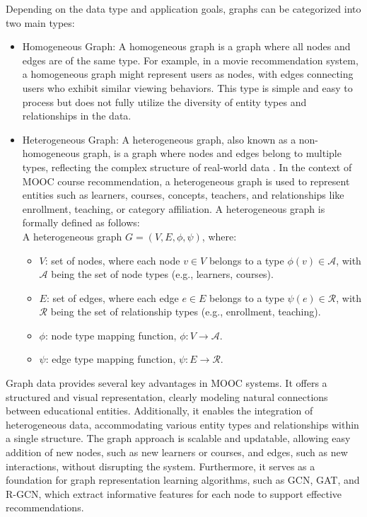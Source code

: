 \documentclass{ieeeaccess}
\begin{document}
Depending on the data type and application goals, graphs can be categorized into two main types:
\begin{itemize}
    \item Homogeneous Graph: A homogeneous graph is a graph where all nodes and edges are of the same type. For example, in a movie recommendation system, a homogeneous graph might represent users as nodes, with edges connecting users who exhibit similar viewing behaviors. This type is simple and easy to process but does not fully utilize the diversity of entity types and relationships in the data.
    \item Heterogeneous Graph: A heterogeneous graph, also known as a non-homogeneous graph, is a graph where nodes and edges belong to multiple types, reflecting the complex structure of real-world data \cite{shi2018heterogeneous}. In the context of MOOC course recommendation, a heterogeneous graph is used to represent entities such as learners, courses, concepts, teachers, and relationships like enrollment, teaching, or category affiliation. A heterogeneous graph is formally defined as follows:\\
    A heterogeneous graph \( G = (V, E, \phi, \psi) \), where:
    \begin{itemize}
        \item \( V \): set of nodes, where each node \( v \in V \) belongs to a type \( \phi(v) \in \mathcal{A} \), with \( \mathcal{A} \) being the set of node types (e.g., learners, courses).
        \item \( E \): set of edges, where each edge \( e \in E \) belongs to a type \( \psi(e) \in \mathcal{R} \), with \( \mathcal{R} \) being the set of relationship types (e.g., enrollment, teaching).
        \item \( \phi \): node type mapping function, \( \phi: V \rightarrow \mathcal{A} \).
        \item \( \psi \): edge type mapping function, \( \psi: E \rightarrow \mathcal{R} \).
    \end{itemize}

\end{itemize}

Graph data provides several key advantages in MOOC systems. It offers a structured and visual representation, clearly modeling natural connections between educational entities. Additionally, it enables the integration of heterogeneous data, accommodating various entity types and relationships within a single structure. The graph approach is scalable and updatable, allowing easy addition of new nodes, such as new learners or courses, and edges, such as new interactions, without disrupting the system. Furthermore, it serves as a foundation for graph representation learning algorithms, such as GCN, GAT, and R-GCN, which extract informative features for each node to support effective recommendations.
\end{document}
